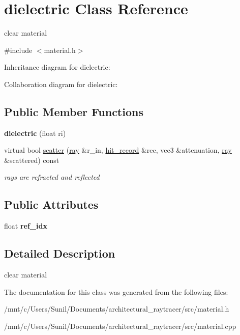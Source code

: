 \hypertarget{classdielectric}{}\section{dielectric Class Reference}
\label{classdielectric}


clear material  




{\ttfamily \#include $<$material.\+h$>$}



Inheritance diagram for dielectric\+:


Collaboration diagram for dielectric\+:
\subsection*{Public Member Functions}
\begin{DoxyCompactItemize}
\item 
\mbox{\label{classdielectric_a58c81c3083387525d4be1ea255bf6a51}} 
{\bfseries dielectric} (float ri)
\item 
\mbox{\label{classdielectric_abfac7c2499f64b0a5589bb3980c4e59f}} 
virtual bool \hyperlink{classdielectric_abfac7c2499f64b0a5589bb3980c4e59f}{scatter} (\hyperlink{classray}{ray} \&r\+\_\+in, \hyperlink{structhit__record}{hit\+\_\+record} \&rec, vec3 \&attenuation, \hyperlink{classray}{ray} \&scattered) const
\begin{DoxyCompactList}\small\item\em rays are refracted and reflected \end{DoxyCompactList}\end{DoxyCompactItemize}
\subsection*{Public Attributes}
\begin{DoxyCompactItemize}
\item 
\mbox{\label{classdielectric_af28805e4747ef627fdada16881ff4a06}} 
float {\bfseries ref\+\_\+idx}
\end{DoxyCompactItemize}


\subsection{Detailed Description}
clear material 

The documentation for this class was generated from the following files\+:\begin{DoxyCompactItemize}
\item 
/mnt/c/\+Users/\+Sunil/\+Documents/architectural\+\_\+raytracer/src/material.\+h\item 
/mnt/c/\+Users/\+Sunil/\+Documents/architectural\+\_\+raytracer/src/material.\+cpp\end{DoxyCompactItemize}
